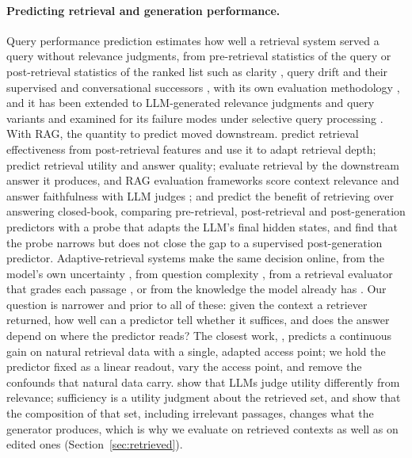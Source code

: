 \documentclass[acmsmall,screen,review]{acmart}
\begin{document}
\paragraph{Predicting retrieval and generation performance.}
Query performance prediction estimates how well a retrieval system served a query without relevance judgments, from pre-retrieval statistics of the query \citep{hauff2008survey} or post-retrieval statistics of the ranked list such as clarity \citep{cronentownsend2002predicting}, query drift \citep{shtok2012predicting} and their supervised and conversational successors \citep{carmel2010estimating,arabzadeh2021bertqpp,datta2022deepqpp,datta2022pointwise,meng2023qppconv,faggioli2026introduction}, with its own evaluation methodology \citep{faggioli2022smare}, and it has been extended to LLM-generated relevance judgments \citep{meng2025query} and query variants \citep{tian2026raqgqpp} and examined for its failure modes under selective query processing \citep{chifu2026uncovering}. With RAG, the quantity to predict moved downstream. \citet{sinha2026adaptive} predict retrieval effectiveness from post-retrieval features and use it to adapt retrieval depth; \citet{tian2026predicting} predict retrieval utility and answer quality; \citet{salemi2024evaluating} evaluate retrieval by the downstream answer it produces, and RAG evaluation frameworks score context relevance and answer faithfulness with LLM judges \citep{es2024ragas,saadfalcon2024ares}; and \citet{dado2026benefit} predict the benefit of retrieving over answering closed-book, comparing pre-retrieval, post-retrieval and post-generation predictors with a probe that adapts the LLM's final hidden states, and find that the probe narrows but does not close the gap to a supervised post-generation predictor. Adaptive-retrieval systems make the same decision online, from the model's own uncertainty \citep{jiang2023active,su2024dragin,wang2023skr,moskvoretskii2025adaptive}, from question complexity \citep{jeong2024adaptive}, from a retrieval evaluator that grades each passage \citep{yan2024corrective}, or from the knowledge the model already has \citep{mallen2023trust,ren2025investigating}. Our question is narrower and prior to all of these: given the context a retriever returned, how well can a predictor tell whether it suffices, and does the answer depend on where the predictor reads? The closest work, \citet{dado2026benefit}, predicts a continuous gain on natural retrieval data with a single, adapted access point; we hold the predictor fixed as a linear readout, vary the access point, and remove the confounds that natural data carry. \citet{zhang2024utility} show that LLMs judge utility differently from relevance; sufficiency is a utility judgment about the retrieved set, and \citet{cuconasu2024power} show that the composition of that set, including irrelevant passages, changes what the generator produces, which is why we evaluate on retrieved contexts as well as on edited ones (Section~\ref{sec:retrieved}).
\end{document}
